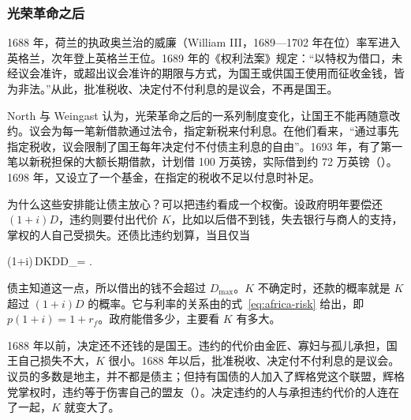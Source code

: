 \subsubsection{光荣革命之后}
1688 年，荷兰的执政奥兰治的威廉（William III，1689—1702 年在位）率军进入英格兰，次年登上英格兰王位。1689 年的《权利法案》规定：“以特权为借口，未经议会准许，或超出议会准许的期限与方式，为国王或供国王使用而征收金钱，皆为非法。”\cite{billofrights1689}从此，批准税收、决定付不付利息的是议会，不再是国王。

North 与 Weingast 认为，光荣革命之后的一系列制度变化，让国王不能再随意改约。议会为每一笔新借款通过法令，指定新税来付利息。在他们看来，“通过事先指定税收，议会限制了国王每年决定付不付债主利息的自由”。1693 年，有了第一笔以新税担保的大额长期借款，计划借 100 万英镑，实际借到约 72 万英镑（）。1698 年，又设立了一个基金，在指定的税收不足以付息时补足\cite{nw1989}。

为什么这些安排能让债主放心？可以把违约看成一个权衡。设政府明年要偿还 $(1+i)D$，违约则要付出代价 $K$，比如以后借不到钱，失去银行与商人的支持，掌权的人自己受损失。还债比违约划算，当且仅当
\begin{keyeq}
(1+i)\,D\;\le\;K\qquad\Longleftrightarrow\qquad D\;\le\;D_{\max}= .\label{eq:finrev-commit}
\end{keyeq}
债主知道这一点，所以借出的钱不会超过 $D_{\max}$。$K$ 不确定时，还款的概率就是 $K$ 超过 $(1+i)D$ 的概率。它与利率的关系由的式~\eqref{eq:africa-risk} 给出，即 $p(1+i)=1+r_f$。政府能借多少，主要看 $K$ 有多大。

\begin{intuition}[决定违约的人要承担违约的代价]
1688 年以前，决定还不还钱的是国王。违约的代价由金匠、寡妇与孤儿承担，国王自己损失不大，$K$ 很小。1688 年以后，批准税收、决定付不付利息的是议会。议员的多数是地主，并不都是债主；但持有国债的人加入了辉格党这个联盟，辉格党掌权时，违约等于伤害自己的盟友（）。决定违约的人与承担违约代价的人连在了一起，$K$ 就变大了。
\end{intuition}


